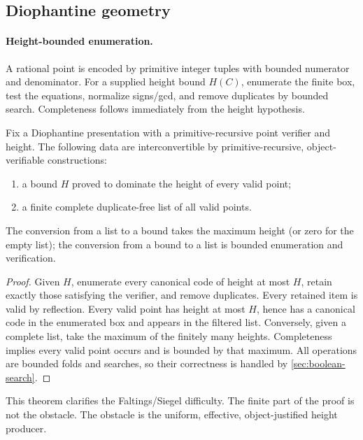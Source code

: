 \subsection{Diophantine geometry}

\paragraph{Height-bounded enumeration.}
A rational point is encoded by primitive integer tuples with bounded numerator and denominator.  For a supplied height bound \(H(C)\), enumerate the finite box, test the equations, normalize signs/gcd, and remove duplicates by bounded search.  Completeness follows immediately from the height hypothesis.

\begin{theorem}\label{thm:height-list}
Fix a Diophantine presentation with a primitive-recursive point verifier and height.  The following data are interconvertible by primitive-recursive, object-verifiable constructions:
\begin{enumerate}[label=(\roman*)]
  \item a bound \(H\) proved to dominate the height of every valid point;
  \item a finite complete duplicate-free list of all valid points.
\end{enumerate}
The conversion from a list to a bound takes the maximum height (or zero for the empty list); the conversion from a bound to a list is bounded enumeration and verification.
\end{theorem}

\begin{proof}
Given \(H\), enumerate every canonical code of height at most \(H\), retain exactly those satisfying the verifier, and remove duplicates.  Every retained item is valid by reflection.  Every valid point has height at most \(H\), hence has a canonical code in the enumerated box and appears in the filtered list.  Conversely, given a complete list, take the maximum of the finitely many heights.  Completeness implies every valid point occurs and is bounded by that maximum.  All operations are bounded folds and searches, so their correctness is handled by \cref{sec:boolean-search}.
\end{proof}

This theorem clarifies the Faltings/Siegel difficulty.  The finite part of the proof is not the obstacle.  The obstacle is the uniform, effective, object-justified height producer.

